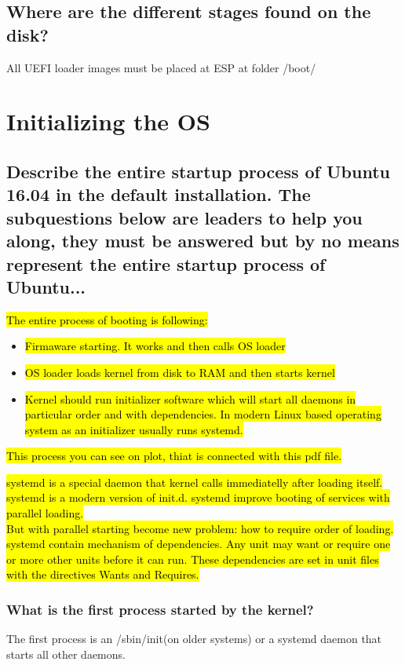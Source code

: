 \documentclass[a4paper,11pt]{article}
\theoremstyle{mytheor}
\begin{document}
\subsection{Where are the different stages found on the disk?}
All UEFI loader images must be placed at ESP at folder /boot/

\section{Initializing the OS}
\addtocounter{subsection}{8}
\subsection{Describe the entire startup process of Ubuntu 16.04 in the default installation. The subquestions below are leaders to help you along, they must be answered but by no means represent the entire startup process of Ubuntu...}

\hl{The entire process of booting is following:}

\begin{itemize}
    \item \hl{Firmaware starting. It works and then calls OS loader}
    \item \hl{OS loader loads kernel from disk to RAM and then starts kernel}
    \item \hl{Kernel should run initializer software which will start all daemons in particular order and with dependencies. In modern Linux based operating system as an initializer usually runs systemd.}
\end{itemize}

\hl{This process you can see on plot, thiat is connected with this pdf file.}

\hl{systemd is a special daemon that kernel calls immediatelly after loading itself. systemd is a modern version of init.d. systemd improve booting of services with parallel loading.}\\
\hl{But with parallel starting become new problem: how to require order of loading. systemd contain mechanism of dependencies. Any unit may want or require one or more other units before it can run. These dependencies are set in unit files with the directives Wants and Requires.}


\subsubsection{What is the first process started by the kernel?}
The first process is an /sbin/init(on older systems) or a systemd daemon that starts all other daemons.
\end{document}
